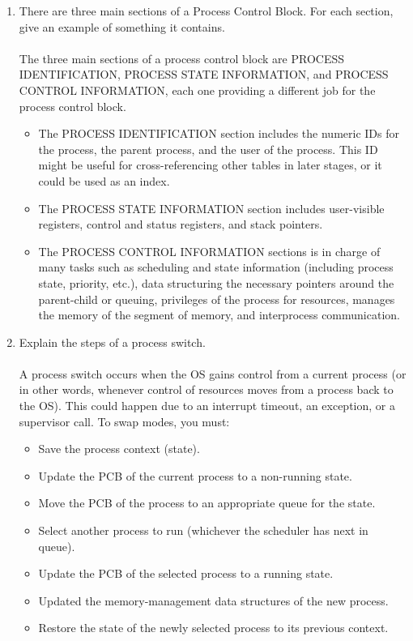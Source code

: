 \documentclass[12pt]{article}
\begin{document}
\begin{enumerate}
	\item There are three main sections of a Process Control Block.  For each section, 
   give an example of something it contains. \\ \\   
   The three main sections of a process control block are PROCESS IDENTIFICATION, PROCESS STATE INFORMATION, and PROCESS CONTROL INFORMATION, each one providing a different job for the process control block.
   \begin{itemize}
   		\item The PROCESS IDENTIFICATION section includes the numeric IDs for the process, the parent process, and the user of the process. This ID might be useful for cross-referencing other tables in later stages, or  it could be used as an index.
   		\item The PROCESS STATE INFORMATION section includes user-visible registers, control and status registers, and stack pointers.
   		\item The PROCESS CONTROL INFORMATION sections is in charge of many tasks such as scheduling and state information (including process state, priority, etc.), data structuring the necessary pointers around the parent-child or queuing, privileges of the process for resources, manages the memory of the segment of memory, and interprocess communication. \\
   \end{itemize}
   \pagebreak
   \item Explain the steps of a process switch. \\ \\
	A process switch occurs when the OS gains control from a current process (or in other words, whenever control of resources moves from a process back to the OS). This could happen due to an interrupt timeout, an exception, or a supervisor call. To swap modes, you must:
	\begin{itemize}
		\item Save the process context (state).
		\item Update the PCB of the current process to a non-running state.
		\item Move the PCB of the process to an appropriate queue for the state.
		\item Select another process to run (whichever the scheduler has next in queue).
		\item Update the PCB of the selected process to a running state.
		\item Updated the memory-management data structures of the new process.
		\item Restore the state of the newly selected process to its previous context. \\
	\end{itemize}


\end{enumerate}
\end{document}
